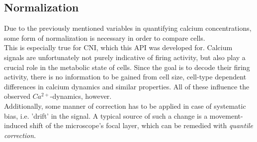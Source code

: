 \documentclass[titlepage]{article}
\begin{document}
\subsection{Normalization} \label{norm}
Due to the previously mentioned variables in quantifying calcium concentrations, some form of normalization is necessary in order to compare cells.\\
This is especially true for CNI, which this API was developed for.
Calcium signals are unfortunately not purely indicative of firing activity, but also play a crucial role in the metabolic state of cells\cite{nover_lehrbuch_2005}.
Since the goal is to decode their firing activity, there is no information to be gained from cell size, cell-type dependent differences in calcium dynamics and similar properties. All of these influence the observed $Ca^{2+}$-dynamics, however\cite{smetters_detecting_1999}.\\
Additionally, some manner of correction has to be applied in case of systematic bias, i.e. 'drift' in the signal. A typical source of such a change is a movement-induced shift of the microscope's focal layer, which can be remedied with \emph{quantile correction}.
\end{document}
